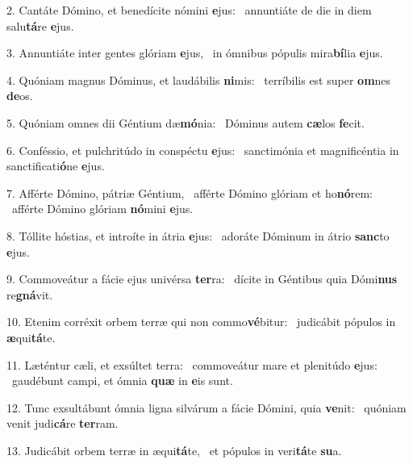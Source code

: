 2. Cantáte Dómino, et benedícite nómini \textbf{e}jus: \ast\  annuntiáte de die in diem salu\textbf{tá}re \textbf{e}jus.\

3. Annuntiáte inter gentes glóriam \textbf{e}jus, \ast\  in ómnibus pópulis mira\textbf{bí}lia \textbf{e}jus.\

4. Quóniam magnus Dóminus, et laudábilis \textbf{ni}mis: \ast\  terríbilis est super \textbf{om}nes \textbf{de}os.\

5. Quóniam omnes dii Géntium dæ\textbf{mó}nia: \ast\  Dóminus autem \textbf{cæ}los \textbf{fe}cit.\

6. Conféssio, et pulchritúdo in conspéctu \textbf{e}jus: \ast\  sanctimónia et magnificéntia in sanctificati\textbf{ó}ne \textbf{e}jus.\

7. Afférte Dómino, pátriæ Géntium, \dag\  afférte Dómino glóriam et ho\textbf{nó}rem: \ast\  afférte Dómino glóriam \textbf{nó}mini \textbf{e}jus.\

8. Tóllite hóstias, et introíte in átria \textbf{e}jus: \ast\  adoráte Dóminum in átrio \textbf{sanc}to \textbf{e}jus.\

9. Commoveátur a fácie ejus univérsa \textbf{ter}ra: \ast\  dícite in Géntibus quia Dómi\textbf{nus} re\textbf{gná}vit.\

10. Etenim corréxit orbem terræ qui non commo\textbf{vé}bitur: \ast\  judicábit pópulos in \textbf{æ}qui\textbf{tá}te.\

11. Læténtur cæli, et exsúltet terra: \dag\  commoveátur mare et plenitúdo \textbf{e}jus: \ast\  gaudébunt campi, et ómnia \textbf{quæ} in \textbf{e}is sunt.\

12. Tunc exsultábunt ómnia ligna silvárum a fácie Dómini, quia \textbf{ve}nit: \ast\  quóniam venit judi\textbf{cá}re \textbf{ter}ram.\

13. Judicábit orbem terræ in æqui\textbf{tá}te, \ast\  et pópulos in veri\textbf{tá}te \textbf{su}a.\

